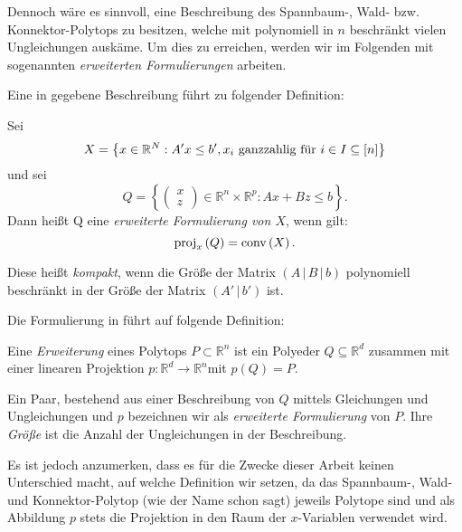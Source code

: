 \documentclass[10p,a4paper,BCOR = 12mm, DIV=15]{scrbook}
\begin{document}
Dennoch wäre es sinnvoll, eine Beschreibung des Spannbaum-, Wald- bzw. Konnek\-tor-Polytops zu besitzen, welche mit polynomiell in $n$ beschränkt vielen Ungleichungen auskäme. Um dies zu erreichen, werden wir im Folgenden mit sogenannten \emph{erweiterten Formulierungen} arbeiten.

Eine in \cite{springerlink:ext_form_comb_opt} gegebene Beschreibung führt zu folgender Definition:
\begin{Def}
Sei
\begin{displaymath}
X = \left\{x \in \mathbb{R}^N: A' x \leq b', x_i \textnormal{ ganzzahlig für } i \in I \subseteq \left[n\right]\right\}
\end{displaymath}
und sei
\begin{displaymath}
Q=\left\{\left(\begin{array}{c}
x \\
z
\end{array}\right) \in \mathbb{R}^n \times \mathbb{R}^p: A x + B z \leq b\right\}.
\end{displaymath}
Dann heißt Q eine \emph{erweiterte Formulierung von $X$}, wenn gilt:
\begin{displaymath}
\operatorname{proj}_x\left(Q\right) = \operatorname{conv} \left(X\right).
\end{displaymath}

Diese heißt \emph{kompakt}, wenn die Größe der Matrix $\left(A\,|\,B\,|\,b\right)$ polynomiell beschränkt in der Größe der Matrix $\left(A'\,|\,b'\right)$ ist.
\end{Def}

Die Formulierung in \cite{optima:ext_form_comb_opt} führt auf folgende Definition:

\begin{Def}
Eine \emph{Erweiterung} eines Polytops $P \subset \mathbb{R}^n$ ist ein Polyeder $Q \subseteq \mathbb{R}^d$ zusammen mit einer linearen Projektion $p: \mathbb{R}^d \rightarrow \mathbb{R}^n$mit $p\left(Q\right) = P$.

Ein Paar, bestehend aus einer Beschreibung von $Q$ mittels Gleichungen und Ungleichungen und $p$ bezeichnen wir als \emph{erweiterte Formulierung} von $P$. Ihre \emph{Größe} ist die Anzahl der Ungleichungen in der Beschreibung.
\end{Def}

Es ist jedoch anzumerken, dass es für die Zwecke dieser Arbeit keinen Unterschied macht, auf welche Definition wir setzen, da das Spannbaum-, Wald- und Konnektor-Polytop (wie der Name schon sagt) jeweils Polytope sind und als Abbildung $p$ stets die Projektion in den Raum der $x$-Variablen verwendet wird.
\end{document}

